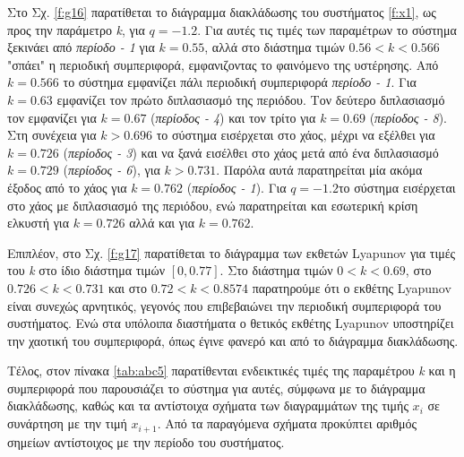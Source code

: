 Στο Σχ. \ref{f:g16} παρατίθεται το διάγραμμα διακλάδωσης του συστήματος \ref{f:x1}, ως προς την παράμετρο \emph{k}, για $q =- 1.2$. Για αυτές τις τιμές των παραμέτρων το σύστημα ξεκινάει από \emph{περίοδο - 1} για $k = 0.55$, αλλά στο διάστημα τιμών $0.56<k<0.566$ "σπάει" η περιοδική συμπεριφορά, εμφανιζοντας το φαινόμενο της υστέρησης. Από $k=0.566$ το σύστημα εμφανίζει πάλι περιοδική συμπεριφορά \emph{περίοδο - 1}. Για  $k = 0.63$ εμφανίζει τον πρώτο διπλασιασμό της περιόδου. Τον δεύτερο διπλασιασμό τον εμφανίζει για $k=0.67$ (\emph{περίοδος - 4}) και τον τρίτο για $k=0.69$ (\emph{περίοδος -   8}). Στη συνέχεια για $k>0.696$ το σύστημα εισέρχεται στο χάος, μέχρι να εξέλθει για $k=0.726$  (\emph{περίοδος - 3}) και να ξανά εισέλθει στο χάος μετά από ένα διπλασιασμό $k=0.729$ (\emph{περίοδος - 6}), για $k>0.731$. Παρόλα αυτά παρατηρείται μία ακόμα έξοδος από το χάος για $k=0.762$ (\emph{περίοδος -   1}). Για $q=-1.2$το σύστημα εισέρχεται στο χάος με διπλασιασμό της περιόδου, ενώ παρατηρείται και εσωτερική κρίση ελκυστή για $k=0.726$ αλλά και για $k=0.762$.

Επιπλέον, στο Σχ. \ref{f:g17} παρατίθεται το διάγραμμα των εκθετών Lyapunov για τιμές του \emph{k} στο ίδιο διάστημα τιμών $[0, 0.77]$. Στο διάστημα τιμών  $0<k<0.69$, στο $0.726<k<0.731$ και στο $0.72<k<0.8574$ παρατηρούμε ότι ο εκθέτης Lyapunov είναι συνεχώς αρνητικός, γεγονός που επιβεβαιώνει την περιοδική συμπεριφορά του συστήματος. Ενώ στα υπόλοιπα διαστήματα ο θετικός εκθέτης Lyapunov υποστηρίζει την χαοτική του συμπεριφορά, όπως έγινε φανερό και από το διάγραμμα διακλάδωσης.

Τέλος, στον πίνακα \ref{tab:abc5} παρατίθενται ενδεικτικές τιμές της παραμέτρου \emph{k} και η συμπεριφορά που παρουσιάζει το σύστημα για αυτές, σύμφωνα με το διάγραμμα διακλάδωσης, καθώς και τα αντίστοιχα σχήματα των διαγραμμάτων της τιμής \(x_i\) σε συνάρτηση με την τιμή \(x_{i+1}\). Από τα παραγόμενα σχήματα προκύπτει αριθμός σημείων αντίστοιχος με την περίοδο του συστήματος.\\\\

